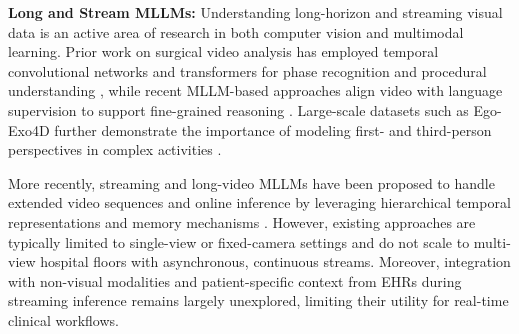 \vspace{1mm}
\noindent \textbf{Long and Stream MLLMs:}
Understanding long-horizon and streaming visual data is an active area of research in both computer vision and multimodal learning. Prior work on surgical video analysis has employed temporal convolutional networks and transformers for phase recognition and procedural understanding \cite{czempiel2020tecno,li2025semivt}, while recent MLLM-based approaches align video with language supervision to support fine-grained reasoning \cite{li2024llava,wang2025endochat,wang2025surgvidlm,yuan2024procedure,yuan2024hecvl,yuan2025learning}. Large-scale datasets such as Ego-Exo4D further demonstrate the importance of modeling first- and third-person perspectives in complex activities \cite{grauman2024ego}.

More recently, streaming and long-video MLLMs have been proposed to handle extended video sequences and online inference by leveraging hierarchical temporal representations and memory mechanisms \cite{chen2025livecc,qian2024streaming}. However, existing approaches are typically limited to single-view or fixed-camera settings and do not scale to multi-view hospital floors with asynchronous, continuous streams. Moreover, integration with non-visual modalities and patient-specific context from EHRs during streaming inference remains largely unexplored, limiting their utility for real-time clinical workflows.




